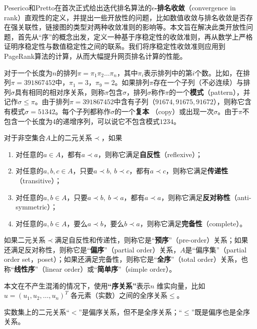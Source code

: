 Peserico和Pretto在\cite{peserico2007does,peserico2012hits}首次正式给出迭代排名算法的\textbf{$\epsilon$-排名收敛}（convergence in rank）直观性的定义，并提出一些开放性的问题，比如数值收敛与排名收敛是否存在强关联性，链接图的类型对两种收敛准则的影响等。本文旨在解决此类开放性问题，首先从“序”的概念出发，定义一种基于序稳定性的收敛准则，再从数学上严格证明序稳定性与数值稳定性之间的联系。我们将序稳定性收敛准则应用到PageRank算法的计算，从而大幅提升网页排名计算的性能。

\begin{definition}[排列模式]%
对于一个长度为$n$的排列$\pi=\pi_1\pi_2\ldots\pi_n$，其中$\pi_i$表示排列中的第$i$个数。比如，在排列$\pi=391867452$中，$\pi_1=3$，$\pi_9=2$。如果排列$\pi$存在一个子列（不必连续）与排列$\sigma$具有相同的相对序关系，则称$\pi$包含$\sigma$，排列$\sigma$称作$\pi$的一个\textbf{模式}（pattern），并记作$\sigma\le \pi$。由于排列$\pi=391867452$中含有子列（$91674, 91675, 91672$），则称它含有模式$\sigma=51342$。每个子列都称作$\sigma$的一个\textbf{复本}
（copy）或出现一次$\sigma$。由于$\pi$不包含一个长度为4的递增序列，可以说它不包含模式$1234$。
\end{definition}

\begin{definition}[序关系]
对于非空集合$A$上的二元关系$\prec$，如果
\begin{enumerate}
    \item 对任意的$a\in A$，都有$a\prec a$，则称它满足\textbf{自反性}（reflexive）；
    \item 对任意的$a,b,c\in A$，只要$a\prec b,~b\prec c$，都有$a\prec c$，则称它满足\textbf{传递性}（transitive）；
    \item 对任意的$a,b\in A$，只要$a\prec b,~b\prec a$，都有$a\prec a$，则称它满足\textbf{反对称性}（anti-symmetric）；
    \item 对任意的$a,b\in A$，要么$a\prec b$，要么$b\prec a$，则称它满足\textbf{完备性}（complete）。
\end{enumerate}
如果二元关系$\prec$满足自反性和传递性，则称它是“\textbf{预序}”（pre-order）关系；如果还满足反对称性，则称它是“\textbf{偏序}”（partial order）关系，$A$是“偏序集”（partial order set，poset）；如果还满足完备性，则称它是“\textbf{全序}”（total order）关系，也称“\textbf{线性序}”（linear order）或“\textbf{简单序}”（simple order）。
\end{definition}

本文在不产生混淆的情况下，使用\textbf{“序关系”}表示$n$ 维实向量，比如$u=(u_1,u_2,\ldots,u_n)^T$ 各元素（实数）之间的全序关系$\le$。
\begin{property}
实数集上的二元关系“$<$”是偏序关系，但不是全序关系；“$\le$”既是偏序也是全序关系。
\end{property}

